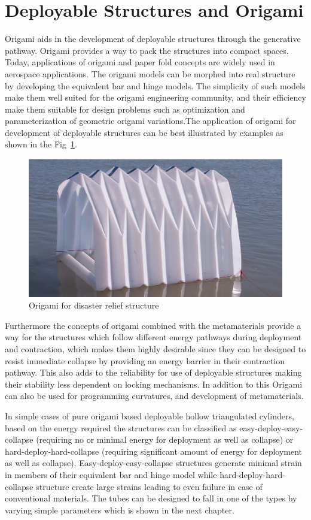 \section{Deployable Structures and Origami}
Origami aids in the development of deployable structures through the generative pathway\cite{rivas2015deployable}. Origami provides a way to pack the structures into compact spaces. Today, applications of origami and paper fold concepts are widely used in aerospace applications. The origami models can be morphed into real structure by developing the equivalent bar and hinge models\cite{FilipBarandHinge}. The simplicity of such models make them well suited for the origami engineering community, and their efficiency make them suitable for design problems such as optimization and parameterization of geometric origami variations.The application of origami for development of deployable structures can be best illustrated by examples as shown in the Fig~\ref{fig:OrigamiEx}.
\begin{figure}[htbp]
    \centering
    \includegraphics[width = 0.5\linewidth]{introduction/fig/OrigamiEx.png}
    \caption{Origami for disaster relief structure \cite{Tepa}}
    \label{fig:OrigamiEx}
\end{figure}


Furthermore the concepts of origami combined with the metamaterials provide a way for the structures which follow different energy pathways during deployment and contraction, which makes them highly desirable since they can be designed to resist immediate collapse by providing an energy barrier in their contraction pathway\cite{Zha}. This also adds to the reliability for use of deployable structures making their stability less dependent on locking mechanisms. In addition to this Origami can also be used for programming curvatures\cite{Dud}, and development of metamaterials\cite{Filip}.

In simple cases of pure origami based deployable hollow triangulated cylinders, based on the energy required the structures can be classified as easy-deploy-easy-collapse (requiring no or minimal energy for deployment as well as collapse) or hard-deploy-hard-collapse (requiring significant amount of energy for deployment as well as collapse). Easy-deploy-easy-collapse structures generate minimal strain in members of their equivalent bar and hinge model while hard-deploy-hard-collapse structure create large strains leading to even failure in case of conventional materials\cite{Zha,FilipBarandHinge}. The tubes can be designed to fall in one of the types by varying simple parameters which is shown in the next chapter.

